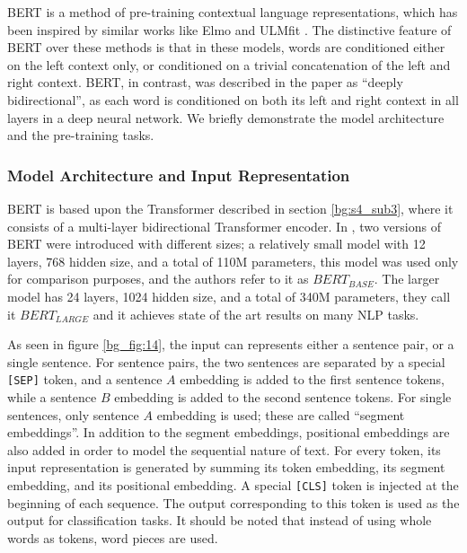 \ac{BERT} \cite{devlin2018bert} is a method of pre-training contextual language representations, which has been inspired by similar works like Elmo \cite{Peters:2018} and ULMfit \cite{howard2018universal}. The distinctive feature of \ac{BERT} over these methods is that in these models, words are conditioned either on the left context only, or conditioned on a trivial concatenation of the left and right context. \ac{BERT}, in contrast, was described in the paper \cite{devlin2018bert} as \enquote{deeply bidirectional}, as each word is conditioned on both its left and right context in all layers in a deep neural network. We briefly demonstrate the model architecture and the pre-training tasks.

\subsubsection{Model Architecture and Input Representation}
\label{bg:s4_sub4_subsub1}

\ac{BERT} is based upon the Transformer \cite{vaswani2017attention} described in section \ref{bg:s4_sub3}, where it consists of a multi-layer bidirectional Transformer encoder. In \cite{devlin2018bert}, two versions of \ac{BERT} were introduced with different sizes; a relatively small model with 12 layers, 768 hidden size, and a total of 110M parameters, this model was used only for comparison purposes, and the authors refer to it as $BERT_{BASE}$. The larger model has 24 layers, 1024 hidden size, and a total of 340M parameters, they call it $BERT_{LARGE}$ and it achieves state of the art results on many \ac{NLP} tasks.

As seen in figure \ref{bg_fig:14}, the input can represents either a sentence pair, or a single sentence. For sentence pairs, the two sentences are separated by a special \texttt{[SEP]} token, and a sentence $A$ embedding is added to the first sentence tokens, while a sentence $B$ embedding is added to the second sentence tokens. For single sentences, only sentence $A$ embedding is used; these are called \enquote{segment embeddings}. In addition to the segment embeddings, positional embeddings \cite{gehring2017convolutional} are also added in order to model the sequential nature of text. For every token, its input representation is generated by summing its token embedding, its segment embedding, and its positional embedding. A special \texttt{[CLS]} token is injected at the beginning of each sequence. The output corresponding to this token is used as the output for classification tasks. It should be noted that instead of using whole words as tokens, word pieces \cite{wu2016google} are used.



